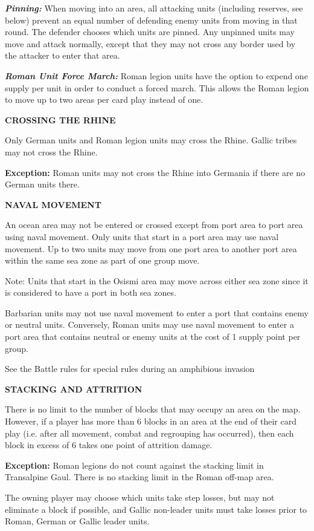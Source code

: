 \textit{\textbf{Pinning:}} When moving into an area, all attacking units (including reserves, see below) prevent an equal number of defending enemy units from moving in that round. The defender chooses which units are pinned. Any unpinned units may move and attack normally, except that they may not cross any border used by the attacker to enter that area.

\textit{\textbf{Roman Unit Force March:}} Roman legion units have the option to expend one supply per unit in order to conduct a forced march. This allows the Roman legion to move up to two areas per card play instead of one.

\textbf{CROSSING THE RHINE}
\par
Only German units and Roman legion units may cross the Rhine. Gallic tribes may not cross the Rhine.

\textbf{Exception:} Roman units may not cross the Rhine into Germania if there are no German units there.

\textbf{NAVAL MOVEMENT}
\par
An ocean area may not be entered or crossed except from port area to port area using naval movement. Only units that start in a port area may use naval movement. Up to two units may move from one port area to another port area within the same sea zone as part of one group move.

Note: Units that start in the Osismi area may move across either sea zone since it is considered to have a port in both sea zones.

Barbarian units may not use naval movement to enter a port that contains enemy or neutral units. Conversely, Roman units may use naval movement to enter a port area that contains neutral or enemy units at the cost of 1 supply point per group.

See the Battle rules for special rules during an amphibious invasion 

\textbf{STACKING AND ATTRITION}
\par
There is no limit to the number of blocks that may occupy an area on the map. However, if a player has more than 6 blocks in an area at the end of their card play (i.e. after all movement, combat and regrouping has occurred), then each block in excess of 6 takes one point of attrition damage.

\textbf{Exception:} Roman legions do not count against the stacking limit in Transalpine Gaul. There is no stacking limit in the Roman off-map area.

The owning player may choose which units take step losses, but may not eliminate a block if possible, and Gallic non-leader units must take losses prior to Roman, German or Gallic leader units.

